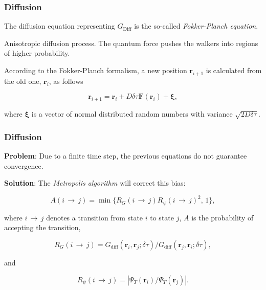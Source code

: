 \begin{frame}
 \frametitle{Diffusion}
 
 The diffusion equation representing $G_\mathrm{Diff}$ is the so-called \textit{Fokker-Planch equation}. 
 
 \pause
 \vspace{0.5cm}
 
 Anisotropic diffusion process. The quantum force pushes the walkers into regions of higher probability. 
 
 \pause
 \vspace{0.5cm}
 
 According to the Fokker-Planch formalism, a new position $\mathbf{r}_{i+1}$ is calculated from the old one, $\mathbf{r}_i$, as follows
 
 \begin{equation}
  \mathbf{r}_{i+1} = \mathbf{r}_i + D\delta\tau\mathbf{F}(\mathbf{r}_i) + \mathbf{\xi}, 
 \end{equation}

where $\mathbf{\xi}$ is a vector of normal distributed random numbers with variance $\sqrt{2D\delta\tau}$.
 
\end{frame}

\begin{frame}
\frametitle{Diffusion}

\textbf{Problem}: Due to a finite time step, the previous equations do not guarantee convergence.  

\pause
\vspace{0.5cm}

\textbf{Solution}: The \textit{Metropolis algorithm} will correct this bias:  

\begin{equation}
  A(i\,\rightarrow\,j) = \min\{R_G(i\,\rightarrow\,j)R_\psi(i\,\rightarrow\,j)^2, \,1\},
\end{equation}

where $i\,\rightarrow\,j$ denotes a transition from state $i$ to state $j$, $A$ is the probability of accepting the transition, 

\begin{equation*}
 R_G(i\,\rightarrow\,j) = G_\mathrm{diff}(\mathbf{r}_{i}, \mathbf{r}_{j}; \delta\tau)/G_\mathrm{diff}(\mathbf{r}_{j}, \mathbf{r}_{i}; \delta\tau),
\end{equation*}

and

\begin{equation*}
 R_\psi(i\,\rightarrow\,j) = |\Psi_T(\mathbf{r}_i)/\Psi_T(\mathbf{r}_j)|.
\end{equation*}

\end{frame}



